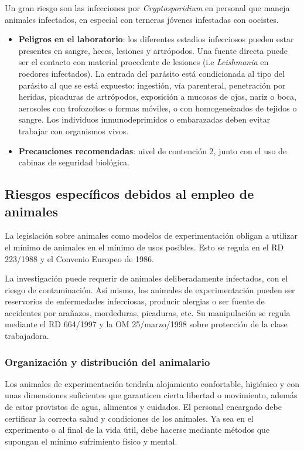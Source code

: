 Un gran riesgo son las infecciones por \textit{Cryptosporidium} en personal que maneja animales infectados, en especial con terneras jóvenes infestadas con oocistes.
\begin{itemize}[itemsep=0pt,parsep=0pt,topsep=0pt,partopsep=0pt]
    \item \textbf{Peligros en el laboratorio}: los diferentes estadios infecciosos pueden estar presentes en sangre, heces, lesiones y artrópodos. Una fuente  directa puede ser el contacto con material procedente de lesiones (i.e \textit{Leishmania} en roedores infectados). La entrada del parásito está condicionada al tipo del parásito al que se está expuesto: ingestión, vía parenteral, penetración por heridas, picaduras de artrópodos, exposición a mucosas de ojos, nariz o boca, aerosoles con trofozoitos o formas móviles, o con homogeneizados de tejidos o sangre. Los individuos inmunodeprimidos o embarazadas deben evitar trabajar con organismos vivos.
    \item \textbf{Precauciones recomendadas}: nivel de contención 2, junto con el uso de cabinas de seguridad biológica.
\end{itemize}
\subsection{Riesgos específicos debidos al empleo de animales}
La legislación sobre animales como modelos de experimentación obligan a utilizar el mínimo de animales en el mínimo de usos posibles. Esto se regula en el RD 223/1988 y el Convenio Europeo de 1986.

La investigación puede requerir de animales deliberadamente infectados, con el riesgo de contaminación. Así mismo, los animales de experimentación pueden ser reservorios de enfermedades infecciosas, producir alergias o ser fuente de accidentes por arañazos, mordeduras, picaduras, etc. Su manipulación se regula mediante el RD 664/1997 y la OM 25/marzo/1998 sobre protección de la clase trabajadora.
\subsubsection{Organización y distribución del animalario}
Los animales de experimentación tendrán alojamiento confortable, higiénico y con unas dimensiones suficientes que garanticen cierta libertad o movimiento, además de estar provistos de agua, alimentos y cuidados. El personal encargado debe certificar la correcta salud y condiciones de los animales. Ya sea en el experimento o al final de la vida útil, debe hacerse mediante métodos que supongan el mínimo sufrimiento físico y mental.

